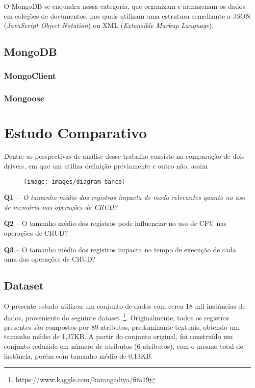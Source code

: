 \documentclass[12pt]{article}
\begin{document}
O MongoDB se enquadra nessa categoria, que organizam e armazenam os dados em coleções de documentos, nos quais utilizam uma estrutura semelhante a JSON (\emph{JavaScript Object Notation}) ou XML (\emph{Extensible Markup Language}). 

\subsection{MongoDB}


\subsubsection{MongoClient}

\subsubsection{Mongoose}



\section{Estudo Comparativo}
\label{section:estudo}

Dentre as perspectivas de análise desse trabalho consiste na comparação de dois drivers, em que um utiliza definição previamente e outro não, assim

\begin{figure}[h]
    \centering
    \texttt{[image: images/diagram-banco]}
    \label{fig:diagrama-banco}
\end{figure}


\textbf{Q1} --~\emph{O tamanho médio dos registros impacta de modo relevantes quanto ao uso de memória nas operações de CRUD?}

\textbf{Q2} -- O tamanho médio dos registros pode influenciar no uso de CPU nas operações de CRUD? 

\textbf{Q3} -- O tamanho médio dos registros impacta no tempo de execução de cada uma das operações de CRUD?


\subsection{Dataset}

O presente estudo utilizou um conjunto de dados com cerca 18 mil instâncias de dados, proveniente do seguinte dataset~\footnote{https://www.kaggle.com/karangadiya/fifa19}.
Originalmente, todos os registros presentes são compostos por 89 atributos, predominante textuais, obtendo um tamanho médio de 1,37KB.
A partir do conjunto original, foi construído um conjunto reduzido em número de atributos (6 atributos), com o mesmo total de instância, porém com tamanho médio de 0,13KB.
\end{document}
